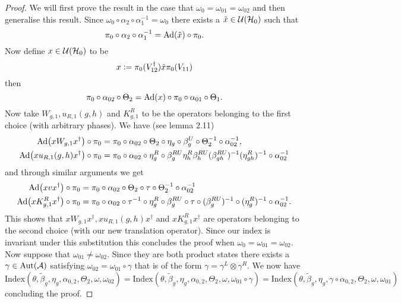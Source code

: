 \documentclass[11pt,a4paper,twoside]{article}
\numberwithin{equation}{section}
\begin{document}
\begin{proof}
	We will first prove the result in the case that $\omega_0=\omega_{01}=\omega_{02}$ and then generalise this result. Since $\omega_0\circ\alpha_2\circ\alpha_1^{-1}=\omega_0$ there exists a $\tilde{x}\in\mathcal U(\mathcal H_0)$ such that
	\begin{equation}
		\pi_0\circ\alpha_2\circ\alpha_1^{-1}=\Ad{\tilde{x}}\circ\pi_0.
	\end{equation}
	Now define $x\in\mathcal U(\mathcal H_0)$ to be
	\begin{equation}
		x\vcentcolon= \pi_0(V_{12}^\dagger)\tilde{x} \pi_0(V_{11})
	\end{equation}
	then
	\begin{equation}
		\pi_0\circ\alpha_{02}\circ\Theta_2=\Ad{x}\circ\pi_0\circ\alpha_{01}\circ\Theta_1.
	\end{equation}
	Now take $W_{g,1},u_{R,1}(g,h)$ and $K^R_{g,1}$ to be the operators belonging to the first choice (with arbitrary phases). 
	We have (see \cite{ogata2021h3gmathbb} lemma 2.11)
	\begin{align}
		\Ad{xW_{g,1}x^\dagger}\circ\pi_0&=\pi_0\circ \alpha_{02}\circ\Theta_2\circ\eta_g\circ\beta_g^U\circ\Theta_2^{-1}\circ\alpha_{02}^{-1},\\
		\Ad{xu_{R,1}(g,h)x^\dagger}\circ\pi_0&=\pi_0\circ \alpha_{02}\circ\eta_g^R\circ\beta_g^{RU}\eta_h^R\beta_{h}^{RU}(\beta_{gh}^{RU})^{-1}(\eta_{gh}^R)^{-1}\circ\alpha_{02}^{-1}
	\end{align}
	and through similar arguments we get
	\begin{align}
		\Ad{xvx^\dagger}\circ\pi_0&=\pi_0\circ\alpha_{02}\circ\Theta_2\circ\tau\circ\Theta_2^{-1}\circ\alpha_{02}^{-1}\\
		\Ad{xK^R_{g,1}x^\dagger}\circ\pi_0&=\pi_0\circ \alpha_{02}\circ\tau^{-1}\circ\eta_g^R\circ\beta_g^{RU}\circ\tau\circ(\beta_g^{RU})^{-1}\circ(\eta^R_g)^{-1}\circ\alpha_{02}^{-1}.
	\end{align}
	This shows that $xW_{g,1}x^\dagger,xu_{R,1}(g,h)x^\dagger$ and $xK^R_{g,1}x^\dagger$ are operators belonging to the second choice (with our new translation operator). Since our index is invariant under this substitution this concludes the proof when $\omega_0=\omega_{01}=\omega_{02}$. Now suppose that $\omega_{01}\neq\omega_{02}$. Since they are both product states there exists a $\gamma\in\Aut{\AA}$ satisfying $\omega_{02}=\omega_{01}\circ\gamma$ that is of the form $\gamma=\gamma^L\otimes\gamma^R$. We now have
	\begin{equation}
		\textrm{Index}(\theta,\tilde{\beta}_g,\eta_g,\alpha_{0,2},\Theta_2,\omega,\omega_{02})=\textrm{Index}(\theta,\tilde{\beta}_g,\eta_g,\alpha_{0,2},\Theta_2,\omega,\omega_{01}\circ\gamma)=\textrm{Index}(\theta,\tilde{\beta}_g,\eta_g,\gamma\circ\alpha_{0,2},\Theta_2,\omega,\omega_{01})
	\end{equation}
	concluding the proof.
\end{proof}
\end{document}
